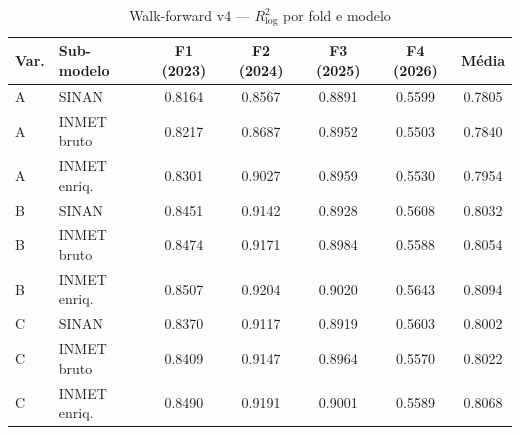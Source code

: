 \begin{table}[htbp]
\centering
\caption{Walk-forward v4 --- $R^2_{\log}$ por fold e modelo}
\label{tab:v4-walkforward}
\small
\begin{tabular}{llccccc}
\toprule
Var. & Sub-modelo & F1 (2023) & F2 (2024) & F3 (2025) & F4 (2026) & Média \\
\midrule
    A & SINAN & 0.8164 & 0.8567 & 0.8891 & 0.5599 & 0.7805 \\
    A & INMET bruto & 0.8217 & 0.8687 & 0.8952 & 0.5503 & 0.7840 \\
    A & INMET enriq. & 0.8301 & 0.9027 & 0.8959 & 0.5530 & 0.7954 \\
    B & SINAN & 0.8451 & 0.9142 & 0.8928 & 0.5608 & 0.8032 \\
    B & INMET bruto & 0.8474 & 0.9171 & 0.8984 & 0.5588 & 0.8054 \\
    B & INMET enriq. & 0.8507 & 0.9204 & 0.9020 & 0.5643 & 0.8094 \\
    C & SINAN & 0.8370 & 0.9117 & 0.8919 & 0.5603 & 0.8002 \\
    C & INMET bruto & 0.8409 & 0.9147 & 0.8964 & 0.5570 & 0.8022 \\
    C & INMET enriq. & 0.8490 & 0.9191 & 0.9001 & 0.5589 & 0.8068 \\
\bottomrule
\end{tabular}
\end{table}
